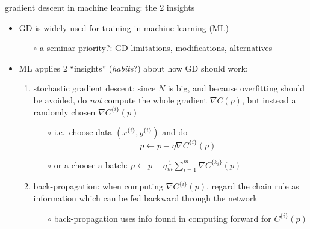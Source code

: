 \documentclass[xcolor={svgnames},
               hyperref={colorlinks,citecolor=DeepPink4,linkcolor=FireBrick,urlcolor=Maroon}]
               {beamer}
\newcommand{\grad}{\nabla}
\begin{document}
\begin{frame}{gradient descent in machine learning: the 2 insights}

\begin{itemize}
\item GD is widely used for training in \alert{machine learning} (ML)
    \begin{itemize}
    \item[$\circ$] a seminar priority?: GD limitations, modifications, alternatives
    \end{itemize}

\medskip
\item ML applies 2 ``insights'' (\emph{habits}?) about how GD should work:
    \begin{enumerate}

\bigskip
    \item \alert{stochastic gradient descent}: since $N$ is big, and because overfitting should be avoided, do \emph{not} compute the whole gradient $\grad C(p)$, but instead a randomly chosen $\grad C^{\{i\}}(p)$
        \begin{itemize}
        \item[$\circ$] i.e.~choose data $(x^{\{i\}},y^{\{i\}})$ and do
            $$p \gets p - \eta \grad C^{\{i\}}(p)$$
        \item[$\circ$] or a choose a \alert{batch}: $p \gets p - \eta \frac{1}{m} \sum_{i=1}^m \grad C^{\{k_i\}}(p)$
        \end{itemize}

\bigskip
    \item \alert{back-propagation}: when computing $\grad C^{\{i\}}(p)$, regard the chain rule as information which can be fed backward through the network
        \begin{itemize}
        \item[$\circ$] back-propagation uses info found in computing forward for $C^{\{i\}}(p)$
        \end{itemize}
    \end{enumerate}
\end{itemize}
\end{frame}
\end{document}
